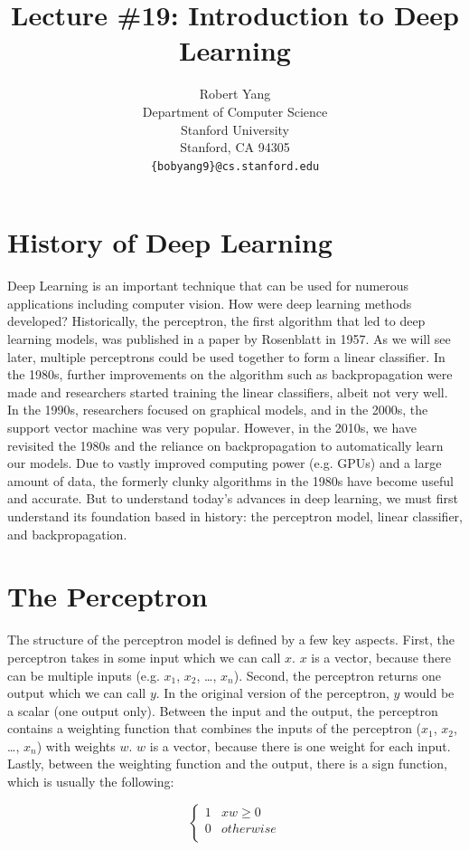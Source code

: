 \documentclass{article}
\title{Lecture \#19: Introduction to Deep Learning}
\author{
  Robert Yang \\
  Department of Computer Science\\
  Stanford University\\
  Stanford, CA 94305 \\
  \texttt{\{bobyang9\}@cs.stanford.edu} \\
}
\begin{document}
\maketitle


\section{History of Deep Learning}
Deep Learning is an important technique that can be used for numerous applications including computer vision. How were deep learning methods developed? Historically, the perceptron, the first algorithm that led to deep learning models, was published in a paper by Rosenblatt in 1957. As we will see later, multiple perceptrons could be used together to form a linear classifier. In the 1980s, further improvements on the algorithm such as backpropagation were made and researchers started training the linear classifiers, albeit not very well. In the 1990s, researchers focused on graphical models, and in the 2000s, the support vector machine was very popular. However, in the 2010s, we have revisited the 1980s and the reliance on backpropagation to automatically learn our models. Due to vastly improved computing power (e.g. GPUs) and a large amount of data, the formerly clunky algorithms in the 1980s have become useful and accurate. But to understand today’s advances in deep learning, we must first understand its foundation based in history: the perceptron model, linear classifier, and backpropagation.

\section{The Perceptron}
The structure of the perceptron model is defined by a few key aspects. First, the perceptron takes in some input which we can call $x$. $x$ is a vector, because there can be multiple inputs (e.g. $x_1$, $x_2$, …, $x_n$). Second, the perceptron returns one output which we can call $y$. In the original version of the perceptron, $y$ would be a scalar (one output only). Between the input and the output, the perceptron contains a weighting function that combines the inputs of the perceptron ($x_1$, $x_2$, …, $x_n$) with weights $w$. $w$ is a vector, because there is one weight for each input. Lastly, between the weighting function and the output, there is a sign function, which is usually the following:

\[   \left\{
\begin{array}{ll}
      1 & xw \geq 0 \\
      0 & otherwise \\
\end{array} 
\right. \]
\end{document}
